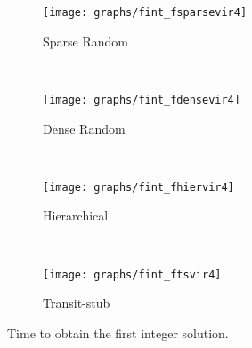 \documentclass[conference]{IEEEtran}
\begin{document}
\begin{figure*}
        \centering
        \begin{subfigure}[b]{0.40\textwidth}
                \texttt{[image: graphs/fint\_fsparsevir4]}
                \caption{Sparse Random}
                \label{fig:s22}
        \end{subfigure}
        ~
        \begin{subfigure}[b]{0.4\textwidth}
                \texttt{[image: graphs/fint\_fdensevir4]}
                \caption{Dense Random}
                \label{fig:d22}
        \end{subfigure}
        \\
        \begin{subfigure}[b]{0.4\textwidth}
                \texttt{[image: graphs/fint\_fhiervir4]}
                \caption{Hierarchical}
                \label{fig:h22}
        \end{subfigure}
        ~ 
        \begin{subfigure}[b]{0.4\textwidth}
                \texttt{[image: graphs/fint\_ftsvir4]}
                \caption{Transit-stub}
                \label{fig:t22}
        \end{subfigure}
        \caption{Time to obtain the first integer solution.}\label{fig:fintgraph}
\end{figure*}
\end{document}
